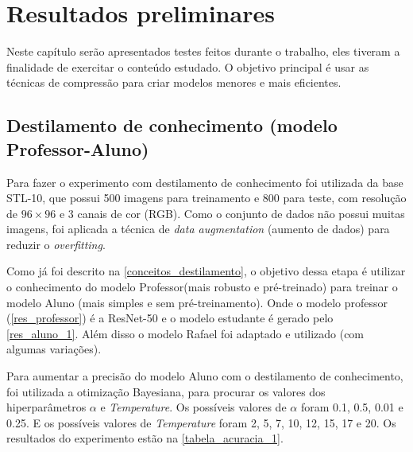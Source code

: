 \chapter{Resultados preliminares}

Neste capítulo serão apresentados testes feitos durante o trabalho, eles tiveram a finalidade de exercitar o
conteúdo estudado. O objetivo principal é usar as técnicas de compressão para criar modelos menores e mais eficientes.


\section{Destilamento de conhecimento (modelo Professor-Aluno)}
Para fazer o experimento com destilamento de conhecimento foi utilizada da base STL-10, que possui 500 imagens para
treinamento e 800 para teste, com resolução de $96 \times 96$ e 3 canais de cor (RGB). Como o conjunto de dados
não possui muitas imagens, foi aplicada a técnica de \textit{data augmentation} (aumento de dados) para reduzir o
\textit{overfitting}.

Como já foi descrito na \autoref{conceitos_destilamento}, o objetivo dessa etapa é utilizar o conhecimento do modelo
Professor(mais robusto e pré-treinado) para treinar o modelo Aluno (mais simples e sem pré-treinamento).
Onde o modelo professor (\autoref{res_professor}) é a ResNet-50  \cite{resnet} e o modelo estudante é gerado pelo
\autoref{res_aluno_1}.
Além disso o modelo Rafael \cite{rafael} foi adaptado e utilizado (com algumas variações).

Para aumentar a precisão do modelo Aluno com o destilamento de conhecimento, foi utilizada a otimização
Bayesiana, para procurar os valores dos hiperparâmetros $\alpha$ e \textit{Temperature}.
Os possíveis valores de $\alpha$ foram 0.1, 0.5, 0.01 e 0.25.
E os possíveis valores de \textit{Temperature} foram 2, 5, 7, 10, 12, 15, 17 e 20.
Os resultados do experimento estão na \autoref{tabela_acuracia_1}.

